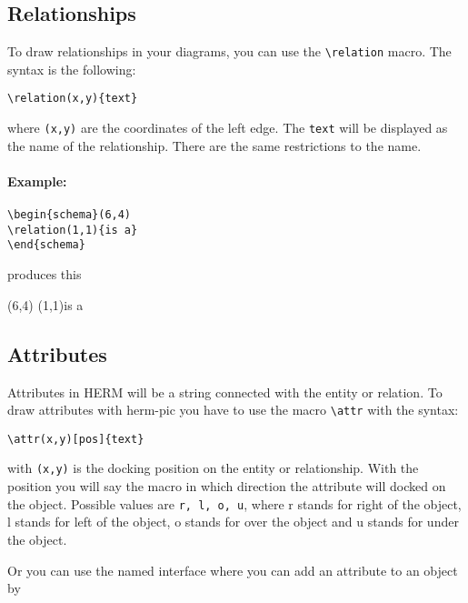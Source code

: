 \documentclass[a4paper,11pt]{article}
\begin{document}
\subsection{Relationships}

To draw relationships in your diagrams, you can use the \verb|\relation| macro.
The syntax is the following:

\begin{verbatim}
\relation(x,y){text}
\end{verbatim}

where {\tt (x,y)} are the coordinates of the left edge. The {\tt text} will be displayed as 
the name of the relationship. There are the same restrictions to the name.

\paragraph{Example:}

\begin{verbatim}
\begin{schema}(6,4)
\relation(1,1){is a}
\end{schema}
\end{verbatim}

produces this

\begin{schema}(6,4)
\relation(1,1){is a}
\end{schema}

\subsection{Attributes}

Attributes in HERM will be a string connected with the entity or relation.
To draw attributes with herm-pic you have to use the macro \verb|\attr| with the syntax:

\begin{verbatim}
\attr(x,y)[pos]{text}
\end{verbatim}

with {\tt (x,y)} is the docking position on the entity or relationship. With the
position you will say the macro in which direction the attribute will docked on
the object. Possible values are {\tt r, l, o, u}, where r stands for right of the object,
l stands for left of the object, o stands for over the object and u stands for under the object.

Or you can use the named interface where you can add an attribute to an object by
\end{document}
